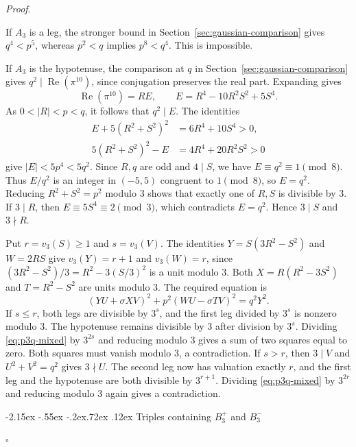 \documentclass[11pt,a4paper,twoside]{article}
\makeatletter
\numberwithin{equation}{section}
\newcommand{\proseheadingstop}{.}
\providecommand{\proofname}{Proof}
\renewcommand{\subsection}{\@startsection{subsection}{2}{\z@}%
  {-2.15ex \@plus -.55ex \@minus -.2ex}{.72ex \@plus .12ex}%
  {\normalfont\normalsize\bfseries}}
\newenvironment{proof}[1][\proofname]{%
  \par\addvspace{.65\baselineskip}\noindent
  \textit{#1}\proseheadingstop\enspace\ignorespaces
}{%
  \unskip\nobreak\hfill\nobreak\(\square\)\par
  \addvspace{.65\baselineskip}
}
\makeatother
\begin{document}
\begin{proof}
If \(A_3\) is a leg, the stronger bound in Section~\ref{sec:gaussian-comparison} gives \(q^4<p^5\), whereas \(p^2<q\) implies \(p^8<q^4\). This is impossible.

If \(A_3\) is the hypotenuse, the comparison at \(q\) in Section~\ref{sec:gaussian-comparison} gives \(q^2\mid\operatorname{Re}(\pi^{10})\), since conjugation preserves the real part. Expanding gives
\[
\operatorname{Re}(\pi^{10})=R E,\qquad E=R^4-10R^2S^2+5S^4.
\]
As \(0<|R|<p<q\), it follows that \(q^2\mid E\). The identities
\[
\begin{aligned}
E+5(R^2+S^2)^2&=6R^4+10S^4>0,\\
5(R^2+S^2)^2-E&=4R^4+20R^2S^2>0
\end{aligned}
\]
give \(|E|<5p^4<5q^2\). Since \(R,q\) are odd and \(4\mid S\), we have \(E\equiv q^2\equiv1\pmod8\). Thus \(E/q^2\) is an integer in \((-5,5)\) congruent to \(1\pmod8\), so \(E=q^2\). Reducing \(R^2+S^2=p^2\) modulo \(3\) shows that exactly one of \(R,S\) is divisible by \(3\). If \(3\mid R\), then \(E\equiv5S^4\equiv2\pmod3\), which contradicts \(E=q^2\). Hence \(3\mid S\) and \(3\nmid R\).

Put \(r=v_3(S)\ge1\) and \(s=v_3(V)\). The identities \(Y=S(3R^2-S^2)\) and \(W=2RS\) give \(v_3(Y)=r+1\) and \(v_3(W)=r\), since \((3R^2-S^2)/3=R^2-3(S/3)^2\) is a unit modulo \(3\). Both \(X=R(R^2-3S^2)\) and \(T=R^2-S^2\) are units modulo \(3\). The required equation is
\begin{equation}\label{eq:p3q-mixed}
(YU+\sigma XV)^2+p^2(WU-\sigma TV)^2=q^2Y^2.
\end{equation}
If \(s\le r\), both legs are divisible by \(3^s\), and the first leg divided by \(3^s\) is nonzero modulo \(3\). The hypotenuse remains divisible by \(3\) after division by \(3^s\). Dividing \eqref{eq:p3q-mixed} by \(3^{2s}\) and reducing modulo \(3\) gives a sum of two squares equal to zero. Both squares must vanish modulo \(3\), a contradiction. If \(s>r\), then \(3\mid V\) and \(U^2+V^2=q^2\) gives \(3\nmid U\). The second leg now has valuation exactly \(r\), and the first leg and the hypotenuse are both divisible by \(3^{r+1}\). Dividing \eqref{eq:p3q-mixed} by \(3^{2r}\) and reducing modulo \(3\) again gives a contradiction.

\subsection{Triples containing \texorpdfstring{\(B_3^+\)}{B₃⁺} and \texorpdfstring{\(B_3^-\)}{B₃⁻}}


\end{proof}
\end{document}
